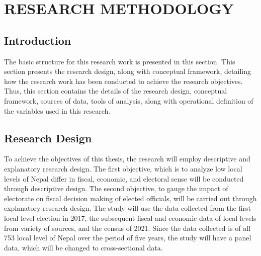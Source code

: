 \newpage
\section{RESEARCH METHODOLOGY} 
\subsection{Introduction}
The basic structure for this research work is presented in this section. This section presents the research design, along with conceptual framework, detailing how the research work has been conducted to achieve the research objectives. Thus, this section contains the details of the research design, conceptual framework, sources of data, tools of analysis, along with operational definition of the variables used in this research.  
\vspace{-5mm}
\subsection{Research Design}
To achieve the objectives of this thesis, the research will employ descriptive and explanatory research design. The first objective, which is to analyze low local levels of Nepal differ in fiscal, economic, and electoral sense will be conducted through descriptive design. The second objective, to gauge the impact of electorate on fiscal decision making of elected officials, will be carried out through explanatory research design. The study will use the data collected from the first local level election in 2017, the subsequent fiscal and economic data of local levels from variety of sources, and the census of 2021. Since the data collected is of all 753 local level of Nepal over the period of five years, the study will have a panel data, which will be changed to cross-sectional data. 
\vspace{-3mm}
